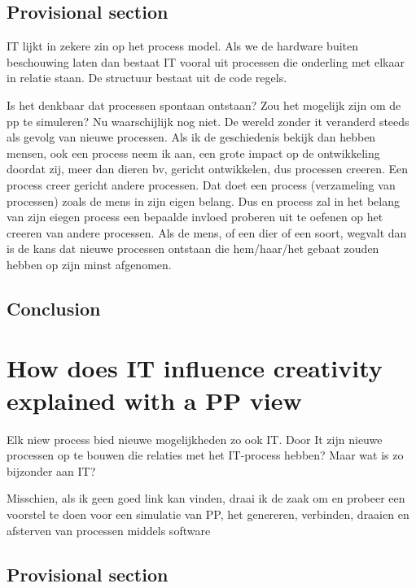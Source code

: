 \documentclass[a4paper]{Thesis}
\begin{document}
\section{Provisional section}



IT lijkt in zekere zin op het process model. Als we de hardware buiten beschouwing laten dan bestaat IT vooral uit processen die onderling met elkaar in relatie staan. De structuur bestaat uit de code regels.

Is het denkbaar dat processen spontaan ontstaan? Zou het mogelijk zijn om de pp te simuleren?
Nu waarschijlijk nog niet.
De wereld zonder it veranderd steeds als gevolg van nieuwe processen.
 Als ik de geschiedenis bekijk dan hebben mensen, ook een process neem ik aan, een grote impact op de ontwikkeling doordat zij, meer dan dieren bv, gericht ontwikkelen, dus processen creeren. Een process creer gericht andere processen.
Dat doet een process (verzameling van processen) zoals de mens in zijn eigen belang. Dus en process zal in het belang van zijn eiegen process een bepaalde invloed proberen uit te oefenen op het creeren van andere processen. Als de mens, of een dier of een soort, wegvalt dan is de kans dat nieuwe processen ontstaan die hem/haar/het gebaat zouden hebben op zijn minst afgenomen.


\section{Conclusion}

\chapter{How does IT influence creativity explained with a PP view}


Elk niew process bied nieuwe mogelijkheden zo ook IT. Door It zijn nieuwe processen op te bouwen die relaties met het IT-process hebben? Maar wat is zo bijzonder aan IT?

Misschien, als ik geen goed link kan vinden, draai ik de zaak om en probeer een voorstel te doen voor een simulatie van PP, het genereren, verbinden, draaien en afsterven van processen middels software

\section{Provisional section}
\end{document}
